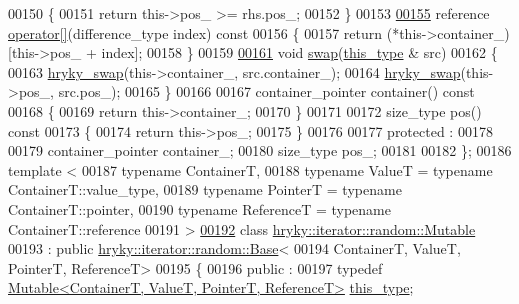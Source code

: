 \begin{DoxyCode}
00150 \textcolor{keyword}{    }\{
00151         \textcolor{keywordflow}{return} this->pos\_ >= rhs.pos\_;
00152     \}
00153 
\hypertarget{iterator__random_8h_source_l00155}{}\hyperlink{classhryky_1_1iterator_1_1random_1_1_base_a6988b0fcaf2cd0113ff4ae48de9aafb9}{00155}     reference \hyperlink{classhryky_1_1iterator_1_1random_1_1_base_a6988b0fcaf2cd0113ff4ae48de9aafb9}{operator[]}(difference\_type index)\textcolor{keyword}{ const}
00156 \textcolor{keyword}{    }\{
00157         \textcolor{keywordflow}{return} (*this->container\_)[this->pos\_ + index];
00158     \}
00159 
\hypertarget{iterator__random_8h_source_l00161}{}\hyperlink{classhryky_1_1iterator_1_1random_1_1_base_acc5694bc21edc91c97d8b55d80b6f110}{00161}     \textcolor{keywordtype}{void} \hyperlink{classhryky_1_1iterator_1_1random_1_1_base_acc5694bc21edc91c97d8b55d80b6f110}{swap}(\hyperlink{classhryky_1_1iterator_1_1random_1_1_base}{this_type} & src)
00162     \{
00163         \hyperlink{namespacehryky_add9c1c1fdfda07cd47bcb7c16d3a823a}{hryky_swap}(this->container\_, src.container\_);
00164         \hyperlink{namespacehryky_add9c1c1fdfda07cd47bcb7c16d3a823a}{hryky_swap}(this->pos\_, src.pos\_);
00165     \}
00166 
00167     container\_pointer container()\textcolor{keyword}{ const}
00168 \textcolor{keyword}{    }\{
00169         \textcolor{keywordflow}{return} this->container\_;
00170     \}
00171 
00172     size\_type pos()\textcolor{keyword}{ const}
00173 \textcolor{keyword}{    }\{
00174         \textcolor{keywordflow}{return} this->pos\_;
00175     \}
00176 
00177 \textcolor{keyword}{protected} :
00178 
00179     container\_pointer container\_;
00180     size\_type pos\_;
00181 
00182 \};
00186 \textcolor{keyword}{template} <
00187     \textcolor{keyword}{typename} ContainerT,
00188     \textcolor{keyword}{typename} ValueT = \textcolor{keyword}{typename} ContainerT::value\_type,
00189     \textcolor{keyword}{typename} PointerT = \textcolor{keyword}{typename} ContainerT::pointer,
00190     \textcolor{keyword}{typename} ReferenceT = \textcolor{keyword}{typename} ContainerT::reference
00191     >
\hypertarget{iterator__random_8h_source_l00192}{}\hyperlink{classhryky_1_1iterator_1_1random_1_1_mutable}{00192} \textcolor{keyword}{class }\hyperlink{classhryky_1_1iterator_1_1random_1_1_mutable}{hryky::iterator::random::Mutable}
00193     : \textcolor{keyword}{public} \hyperlink{classhryky_1_1iterator_1_1random_1_1_base}{hryky::iterator::random::Base}<
00194         ContainerT, ValueT, PointerT, ReferenceT>
00195 \{
00196 \textcolor{keyword}{public} :
00197     \textcolor{keyword}{typedef} \hyperlink{classhryky_1_1iterator_1_1random_1_1_mutable}{Mutable<ContainerT, ValueT, PointerT, ReferenceT>}   \hyperlink{classhryky_1_1iterator_1_1random_1_1_base}{this_type};

\end{DoxyCode}
